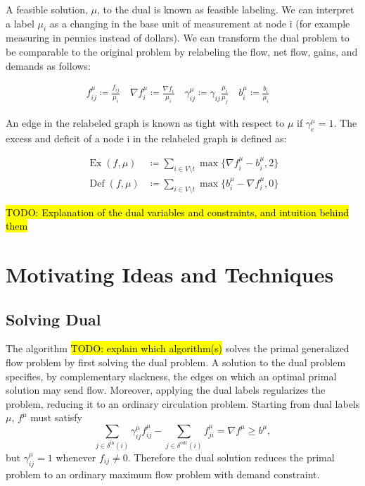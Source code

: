 \documentclass[11pt]{article}
\theoremstyle{definition}
\theoremstyle{definition}
\newcommand{\fu}{f^{\mu}}
\newcommand{\nfiu}{\nabla \fu_i}
\newcommand{\biu}{b_{i}^{\mu}}
\newcommand{\giij}{\gamma_{ij}^{\mu}}
\newcommand{\din}{\delta^{\text{in}}}
\newcommand{\dout}{\delta^{\text{out}}}
\DeclareMathOperator{\Ex}{Ex}
\DeclareMathOperator{\Def}{Def}
\newcommand{\todo}[1]{\hl{TODO: #1}}
\begin{document}
A feasible solution, $\mu$, to the dual is known as feasible labeling. We can interpret a label $\mu_i$ as a changing in the base unit of measurement  at node i (for example measuring in pennies instead of dollars). We can transform the dual problem to be comparable to the original problem by relabeling the flow, net flow, gains, and demands as follows:

\begin{align*}
f_{ij}^\mu \coloneqq \frac{f_{ij}}{\mu_i} \quad
\nabla f_i^\mu \coloneqq \frac{\nabla f_i }{\mu_i} \quad
\gamma_{ij}^\mu \coloneqq \gamma_{ij} \frac{\mu_i}{\mu_j} \quad
b_i^\mu \coloneqq \frac{b_i}{\mu_i} \quad
\end{align*}

An edge in the relabeled graph is known as tight with respect to $\mu$ if $\gamma_e^\mu =1$. The excess and deficit of a node i in the relabeled graph is defined as:


\begin{align*}
\Ex(f,\mu)  &\coloneqq \sum_{i \in V \setminus t} \max \{ \nfiu - \biu, 2 \} \\
\Def(f,\mu) &\coloneqq \sum_{i \in V \setminus t} \max \{ \biu - \nfiu, 0 \}
\end{align*}

\todo{Explanation of the dual variables and constraints, and intuition behind them}
  
\section{Motivating Ideas and Techniques}
	\subsection{Solving Dual}
            
	The algorithm \todo{explain which algorithm(s)} solves the primal generalized flow problem by first solving the dual problem.
    A solution to the dual problem specifies, by complementary slackness, the edges on which an optimal
    primal solution may send flow. Moreover, applying the dual labels regularizes the problem, reducing
    it to an ordinary circulation problem. Starting from dual labels $\mu$, $f^{\mu}$ must satisfy
    \[ \sum_{j \in \din(i)} \giij \fu_{ij} - \sum_{j \in \dout(i)} \fu_{ji}
     = \nabla f^{\mu} \geq b^{\mu}, \]
    but $\giij = 1$ whenever $f_{ij} \neq 0$. Therefore the dual solution reduces the primal problem
    to an ordinary maximum flow problem with demand constraint.
    
\end{document}
